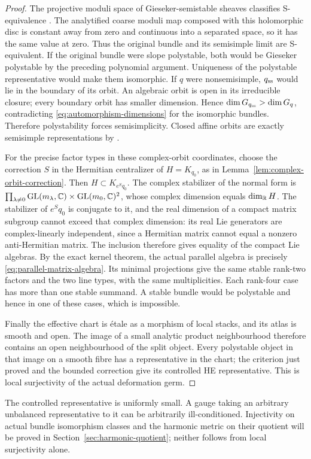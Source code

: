 \begin{proof}
The projective moduli space of Gieseker-semistable sheaves
classifies S-equivalence
\cite[Theorems 4.3.3--4.3.4]{HL}. The analytified coarse
moduli map composed with this holomorphic disc is
constant away from zero and continuous into a separated
space, so it has the same value at zero. Thus the original
bundle and its semisimple limit are S-equivalent.
If the original bundle were slope polystable, both
would be Gieseker polystable by the preceding polynomial
argument. Uniqueness of the polystable representative
\cite[Proposition 1.5.2 and Definitions 1.5.3--1.5.4]{HL}
would make them isomorphic. If $q$ were nonsemisimple,
$q_{\rm ss}$ would lie in the boundary of its orbit.
An algebraic orbit is open in its irreducible closure;
every boundary orbit has smaller dimension. Hence
$\dim G_{q_{\rm ss}}>\dim G_q$, contradicting
\eqref{eq:automorphism-dimensions} for the isomorphic
bundles. Therefore polystability forces semisimplicity.
Closed affine orbits are exactly semisimple representations
by \cite[Proposition 3.2(i), $\theta=0$]{King}.

For the precise factor types in these complex-orbit
coordinates, choose the correction $S$ in the Hermitian
centralizer of $H=K_{q_0}$, as in
Lemma~\ref{lem:complex-orbit-correction}. Then
$H\subset K_{e^Sq_0}$. The complex stabilizer of the
normal form is
$\prod_{\lambda\ne0}\operatorname{GL}(m_\lambda,\mathbb C)\times\operatorname{GL}(m_0,\mathbb C)^2$,
whose complex dimension equals $\dim_\mathbb R H$.
The stabilizer of $e^Sq_0$ is conjugate to it, and the
real dimension of a compact matrix subgroup cannot
exceed that complex dimension: its real Lie generators
are complex-linearly independent, since a Hermitian
matrix cannot equal a nonzero anti-Hermitian matrix.
The inclusion therefore gives equality of the compact
Lie algebras. By the exact kernel theorem, the actual
parallel algebra is precisely
\eqref{eq:parallel-matrix-algebra}. Its minimal projections
give the same stable rank-two factors and the two line
types, with the same multiplicities. Each rank-four
case has more than one stable summand. A stable bundle
would be polystable and hence in one of these cases,
which is impossible.

Finally the effective chart is étale as a morphism of
local stacks, and its atlas is smooth and open.
The image of a small analytic product neighbourhood
therefore contains an open neighbourhood of the split
object. Every polystable object in that image on a
smooth fibre has a representative in the chart; the
criterion just proved and the bounded correction give
its controlled HE representative. This is local
surjectivity of the actual deformation germ.
\end{proof}

The controlled representative is uniformly small.
A gauge taking an arbitrary unbalanced representative
to it can be arbitrarily ill-conditioned.
Injectivity on actual bundle isomorphism classes and
the harmonic metric on their quotient will be proved
in Section~\ref{sec:harmonic-quotient}; neither follows
from local surjectivity alone.
